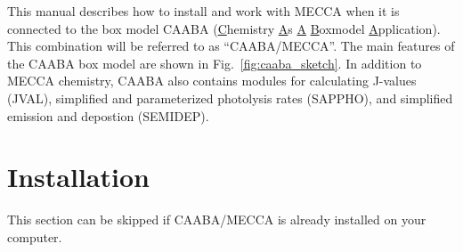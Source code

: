 \documentclass[twoside]{article}
\begin{document}
This manual describes how to install and work with MECCA when it is
connected to the box model CAABA (\underline{C}hemistry \underline{A}s
\underline{A} \underline{B}oxmodel \underline{A}pplication). This
combination will be referred to as ``CAABA/MECCA''. The main features of
the CAABA box model are shown in Fig.~\ref{fig:caaba_sketch}. In
addition to MECCA chemistry, CAABA also contains modules for calculating
J-values (JVAL), simplified and parameterized photolysis rates (SAPPHO),
and simplified emission and depostion (SEMIDEP).

\section{Installation}
\label{sec:install}

This section can be skipped if CAABA/MECCA is already installed on your
computer.
\end{document}
